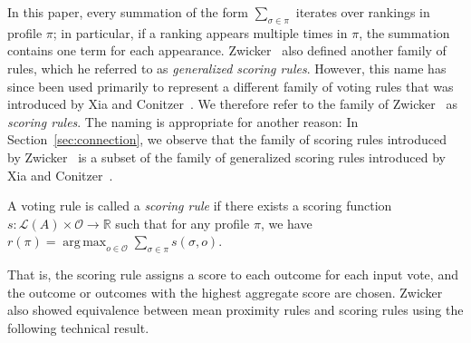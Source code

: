\documentclass[prodmode,acmec]{ec-acmsmall}
\newcommand{\calL}{{\mathcal{L}}}
\newcommand{\rank}{{\calL(A)}}
\newcommand{\calO}{{\mathcal{O}}}
\DeclareMathOperator*{\argmax}{arg\,max}
\DeclareMathOperator*{\argmin}{arg\,min}
\begin{document}
In this paper, every summation of the form $\sum_{\sigma \in \pi}$  iterates over rankings in profile $\pi$; in particular, if a ranking appears multiple times in $\pi$, the summation contains one term for each appearance. Zwicker~ also defined another family of rules, which he referred to as \emph{generalized scoring rules}. However, this name has since been used primarily to represent a different family of voting rules that was introduced by Xia and Conitzer~. We therefore refer to the family of Zwicker~ as \emph{scoring rules}. The naming is appropriate for another reason: In Section~\ref{sec:connection}, we observe that the family of scoring rules introduced by Zwicker~ is a subset of the family of generalized scoring rules introduced by Xia and Conitzer~. 

\begin{definition}
A voting rule is called a \emph{scoring rule} if there exists a scoring function $s : \rank \times \calO \rightarrow \mathbb{R}$ such that for any profile $\pi$, we have $r(\pi) = \argmax_{o \in \calO} \sum_{\sigma \in \pi} s(\sigma,o)$. 
\end{definition}



That is, the scoring rule assigns a score to each outcome for each input vote, and the outcome or outcomes with the highest aggregate score are chosen. Zwicker~ also showed equivalence between mean proximity rules and scoring rules using the following technical result. %
\end{document}
